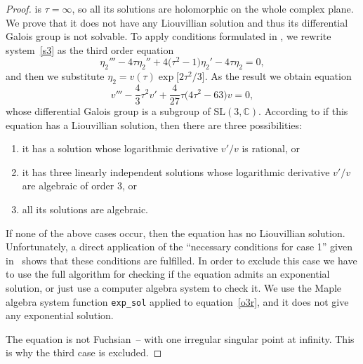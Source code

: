 \documentclass[pdftex]{sigma}
\numberwithin{equation}{section}
\begin{document}
\begin{proof}
 is $\tau=\infty$, so all its solutions are holomorphic on the whole
 complex plane. We prove that it does not have any Liouvillian
 solution and thus its differential Galois group is not solvable. To
 apply conditions formulated in \cite{SU}, we rewrite
 system~\eqref{s3} as the third order equation
 \begin{equation*}
 \eta_2''' -4\tau\eta_2''+ 4\big(\tau^2-1\big)\eta_2' -4\tau \eta_2 = 0,
 \end{equation*}
 and then we substitute $\eta_2 = v(\tau) \exp\big[2\tau^2/3\big]$. As the
 result we obtain equation
 \begin{equation}
 \label{o3r}
 v''' -\frac{4}{3}\tau^2v'+ \frac{4}{27}\tau\big(4\tau^2-63\big)v = 0,
 \end{equation}
 whose differential Galois group is a subgroup of
 $\mathrm{SL}(3,\mathbb{C})$. According to \cite{SU} if this equation
 has a Liouvillian solution, then there are three possibilities:
 \begin{enumerate}\itemsep=0pt
 \item[$(1)$] it has a solution whose logarithmic derivative $v'/v$ is
 rational, or
 \item[$(2)$] it has three linearly independent solutions whose logarithmic
 derivative $v'/v$ are algebraic of order 3, or
 \item[$(3)$] all its solutions are algebraic.
 \end{enumerate}
 If none of the above cases occur, then the equation has no
 Liouvillian solution. Unfortunately, a direct application of the
 ``necessary conditions for case 1'' given in~\cite[p.~9]{SU} shows
 that these conditions are fulfilled. In order to exclude this case
 we have to use the full algorithm for checking if the equation admits an
 exponential solution, or just use a computer algebra system to check
 it. We use the Maple algebra system function \verb+exp_sol+ applied
 to equation~\eqref{o3r}, and it does not give any exponential
 solution.

 The equation is not Fuchsian~-- with one irregular singular point at
 infinity. This is why the third case is excluded.


\end{proof}
\end{document}
